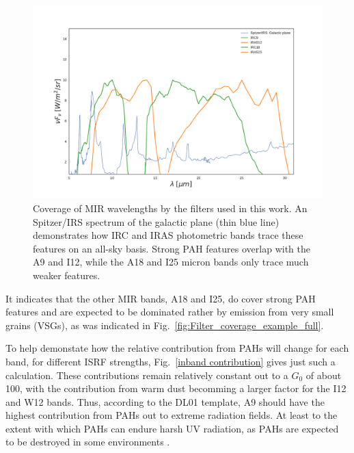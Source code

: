          \begin{figure}
           \centering
           \includegraphics[width=\textwidth]{../Plots/ch_datasources/Filter_coverage_example_MIR.pdf}
           \caption{Coverage of MIR wavelengths by the filters used in this work. An Spitzer/IRS spectrum of the galactic plane (thin blue line) demonstrates how IRC and IRAS photometric bands trace these features on an all-sky basis. Strong PAH features overlap with the A9 and I12, while the A18 and I25 micron bands only trace much weaker features. }
           \label{fig:Filter_coverage_example_MIR}
         \end{figure}
         It indicates that the other MIR bands, A18 and I25, do cover strong PAH features and are expected to be dominated rather by emission from very small grains (VSGs), as was indicated in Fig.~\ref{fig:Filter_coverage_example_full}.

         To help demonstate how the relative contribution from PAHs will change for each band, for different ISRF strengths, Fig.~\ref{inband contribution} gives just such a calculation. These contributions remain relatively constant out to a $G_{0}$ of about 100, with the contribution from warm dust becomming a larger factor for the I12 and W12 bands. Thus, according to the DL01 template, A9 should have the highest contribution from PAHs out to extreme radiation fields. At least to the extent with which PAHs can endure harsh UV radiation, as PAHs are expected to be destroyed in some environments \citep{allain96a,allain96b,pilleri12, pavlyuchenkov13}.

